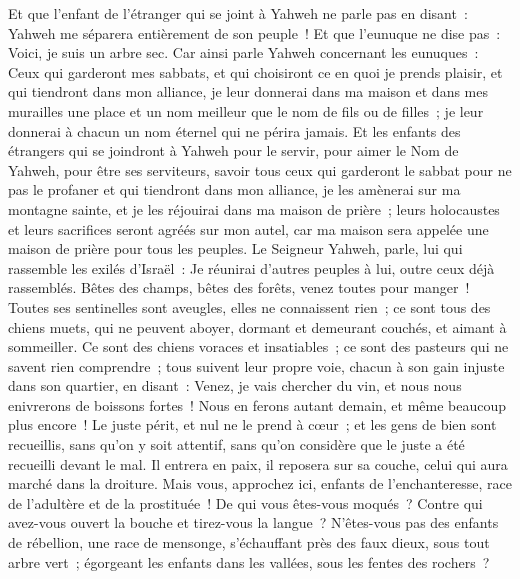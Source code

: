 \begin{multicols}{2}
Et que l'enfant de l'étranger qui se joint à Yahweh ne parle pas en disant~: Yahweh me séparera entièrement de son peuple~! Et que l'eunuque ne dise pas~: Voici, je suis un arbre sec.
Car ainsi parle Yahweh concernant les eunuques~: Ceux qui garderont mes sabbats, et qui choisiront ce en quoi je prends plaisir, et qui tiendront dans mon alliance,
je leur donnerai dans ma maison et dans mes murailles une place et un nom meilleur que le nom de fils ou de filles~; je leur donnerai à chacun un nom éternel qui ne périra jamais.
Et les enfants des étrangers qui se joindront à Yahweh pour le servir, pour aimer le Nom de Yahweh, pour être ses serviteurs, savoir tous ceux qui garderont le sabbat pour ne pas le profaner et qui tiendront dans mon alliance,
je les amènerai sur ma montagne sainte, et je les réjouirai dans ma maison de prière~; leurs holocaustes et leurs sacrifices seront agréés sur mon autel, car ma maison sera appelée une maison de prière pour tous les peuples.
Le Seigneur Yahweh, parle, lui qui rassemble les exilés d'Israël~: Je réunirai d'autres peuples à lui, outre ceux déjà rassemblés.
Bêtes des champs, bêtes des forêts, venez toutes pour manger~!
Toutes ses sentinelles sont aveugles, elles ne connaissent rien~; ce sont tous des chiens muets, qui ne peuvent aboyer, dormant et demeurant couchés, et aimant à sommeiller.
Ce sont des chiens voraces et insatiables~; ce sont des pasteurs qui ne savent rien comprendre~; tous suivent leur propre voie, chacun à son gain injuste dans son quartier, en disant~:
Venez, je vais chercher du vin, et nous nous enivrerons de boissons fortes~! Nous en ferons autant demain, et même beaucoup plus encore~!
\VerseOne{}Le juste périt, et nul ne le prend à cœur~; et les gens de bien sont recueillis, sans qu'on y soit attentif, sans qu'on considère que le juste a été recueilli devant le mal.
Il entrera en paix, il reposera sur sa couche, celui qui aura marché dans la droiture.
Mais vous, approchez ici, enfants de l'enchanteresse, race de l'adultère et de la prostituée~!
De qui vous êtes-vous moqués~? Contre qui avez-vous ouvert la bouche et tirez-vous la langue~? N'êtes-vous pas des enfants de rébellion, une race de mensonge,
s'échauffant près des faux dieux, sous tout arbre vert~; égorgeant les enfants dans les vallées, sous les fentes des rochers~?

\end{multicols}
